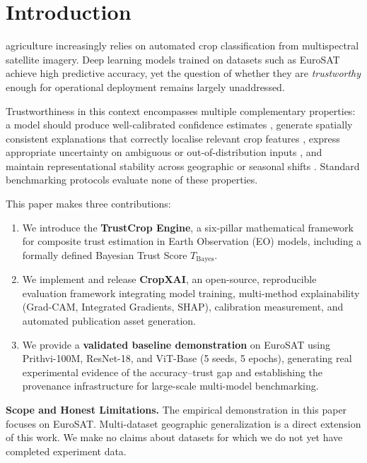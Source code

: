 \documentclass[10pt,journal]{IEEEtran}
\newcommand{\Tbayes}{T_{\mathrm{Bayes}}}
\begin{document}
\section{Introduction}
 agriculture increasingly relies on automated
crop classification from multispectral satellite imagery. Deep learning models
trained on datasets such as EuroSAT \cite{helber2019eurosat} achieve high
predictive accuracy, yet the question of whether they are \emph{trustworthy}
enough for operational deployment remains largely unaddressed.

Trustworthiness in this context encompasses multiple complementary properties:
a model should produce well-calibrated confidence estimates
\cite{guo2017calibration}, generate spatially consistent explanations that
correctly localise relevant crop features \cite{selvaraju2017gradcam}, express
appropriate uncertainty on ambiguous or out-of-distribution inputs
\cite{lakshminarayanan2017ensembles}, and maintain representational stability
across geographic or seasonal shifts \cite{zhang2022trustworthy_survey, arrieta2020xai_survey, kaur2022trustworthy, li2023trustworthy}.
Standard benchmarking protocols evaluate none of these properties.

This paper makes three contributions:
\begin{enumerate}
    \item We introduce the \textbf{TrustCrop Engine}, a six-pillar
    mathematical framework for composite trust estimation in Earth Observation
    (EO) models, including a formally defined Bayesian Trust Score $\Tbayes$.

    \item We implement and release \textbf{CropXAI}, an open-source,
    reproducible evaluation framework integrating model training, multi-method
    explainability (Grad-CAM, Integrated Gradients, SHAP), calibration
    measurement, and automated publication asset generation.

    \item We provide a \textbf{validated baseline demonstration} on EuroSAT
    using Prithvi-100M, ResNet-18, and ViT-Base (5 seeds, 5 epochs), generating real experimental evidence
    of the accuracy--trust gap and establishing the provenance infrastructure
    for large-scale multi-model benchmarking.
\end{enumerate}

\textbf{Scope and Honest Limitations.} The empirical demonstration in this
paper focuses on EuroSAT. Multi-dataset geographic generalization is a direct extension of this work. We make no claims about datasets for which we do not yet have completed experiment data.
\end{document}
